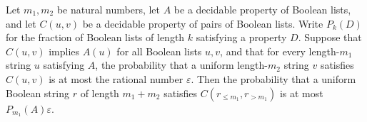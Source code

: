 \begin{theorem}
\label{Randomized.randProb_append_le}
\leanok
{}
Let $m_1,m_2$ be natural numbers, let $A$ be a decidable property of Boolean lists, and
let $C(u,v)$ be a decidable property of pairs of Boolean lists. Write $P_k(D)$ for the
fraction of Boolean lists of length $k$ satisfying a property $D$. Suppose that $C(u,v)$
implies $A(u)$ for all Boolean lists $u,v$, and that for every length-$m_1$ string $u$
satisfying $A$, the probability that a uniform length-$m_2$ string $v$ satisfies
$C(u,v)$ is at most the rational number $\varepsilon$. Then the probability that a
uniform Boolean string $r$ of length $m_1+m_2$ satisfies $C(r_{\le m_1},r_{>m_1})$ is at
most $P_{m_1}(A)\varepsilon$.
\end{theorem}
